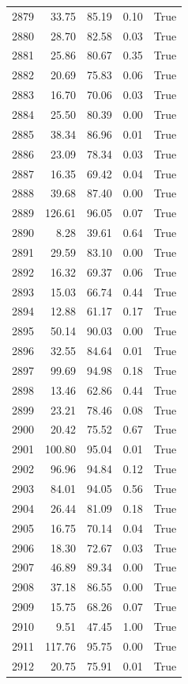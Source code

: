 \begin{longtable}{rrrrr}
2879 & 33.75 & 85.19 & 0.10 & True \\
2880 & 28.70 & 82.58 & 0.03 & True \\
2881 & 25.86 & 80.67 & 0.35 & True \\
2882 & 20.69 & 75.83 & 0.06 & True \\
2883 & 16.70 & 70.06 & 0.03 & True \\
2884 & 25.50 & 80.39 & 0.00 & True \\
2885 & 38.34 & 86.96 & 0.01 & True \\
2886 & 23.09 & 78.34 & 0.03 & True \\
2887 & 16.35 & 69.42 & 0.04 & True \\
2888 & 39.68 & 87.40 & 0.00 & True \\
2889 & 126.61 & 96.05 & 0.07 & True \\
2890 & 8.28 & 39.61 & 0.64 & True \\
2891 & 29.59 & 83.10 & 0.00 & True \\
2892 & 16.32 & 69.37 & 0.06 & True \\
2893 & 15.03 & 66.74 & 0.44 & True \\
2894 & 12.88 & 61.17 & 0.17 & True \\
2895 & 50.14 & 90.03 & 0.00 & True \\
2896 & 32.55 & 84.64 & 0.01 & True \\
2897 & 99.69 & 94.98 & 0.18 & True \\
2898 & 13.46 & 62.86 & 0.44 & True \\
2899 & 23.21 & 78.46 & 0.08 & True \\
2900 & 20.42 & 75.52 & 0.67 & True \\
2901 & 100.80 & 95.04 & 0.01 & True \\
2902 & 96.96 & 94.84 & 0.12 & True \\
2903 & 84.01 & 94.05 & 0.56 & True \\
2904 & 26.44 & 81.09 & 0.18 & True \\
2905 & 16.75 & 70.14 & 0.04 & True \\
2906 & 18.30 & 72.67 & 0.03 & True \\
2907 & 46.89 & 89.34 & 0.00 & True \\
2908 & 37.18 & 86.55 & 0.00 & True \\
2909 & 15.75 & 68.26 & 0.07 & True \\
2910 & 9.51 & 47.45 & 1.00 & True \\
2911 & 117.76 & 95.75 & 0.00 & True \\
2912 & 20.75 & 75.91 & 0.01 & True \\

\end{longtable}
